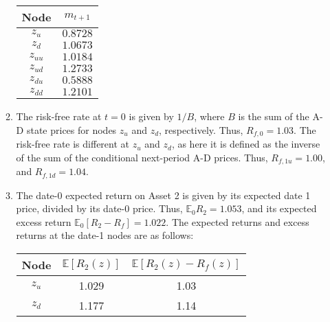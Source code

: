 \documentclass[11pt]{article}
\newcommand{\ev}{\mathbb{E}}
\begin{document}
\begin{enumerate}
\begin{enumerate}
		\begin{table}[!ht]
			\centering
			\begin{tabular}{c | c}
				Node & \(m_{t+1}\) \\ \hline
				\(z_{u}\) & \(0.8728\) \\
				\(z_{d}\) & \(1.0673\) \\
				\(z_{uu}\) & \(1.0184\) \\
				\(z_{ud}\) & \(1.2733\) \\
				\(z_{du}\) & \(0.5888\) \\
				\(z_{dd}\) & \(1.2101\) 
			\end{tabular}
		\end{table}

		\item The risk-free rate at \(t = 0\) is given by \(1 / B\), where \(B\) is the sum of the A-D state prices for nodes \(z_u\) and \(z_d\), respectively. Thus, \(R_{f,0} = 1.03\). The risk-free rate is different at \(z_u\) and \(z_d\), as here it is defined as the inverse of the sum of the conditional next-period A-D prices. Thus, \(R_{f,1u} = 1.00\), and \(R_{f,1d} = 1.04\). 
		\item The date-0 expected return on Asset 2 is given by its expected date 1 price, divided by its date-0 price. Thus, \(\ev_0{R_2} = 1.053\), and its expected excess return \(\ev_0[R_2 - R_f] = 1.022\). The expected returns and excess returns at the date-1 nodes are as follows: \newpage
		
		\begin{table}[!hb]
			\centering
			\begin{tabular}{c | c |c }
				Node & \(\ev[R_2(z)]\) & \(\ev[R_2(z) - R_f(z)]\) \\ \hline
				\(z_u\) & 1.029 & 1.03 \\
				\(z_d\) & 1.177 & 1.14 
			\end{tabular}
		\end{table}


\end{enumerate}
\end{enumerate}
\end{document}
